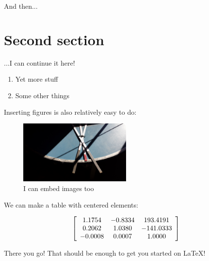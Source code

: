 \documentclass[a4paper,12pt]{article} %
\begin{document}
\noindent
And then...

\section{Second section}

...I can continue it here!

\vspace{5mm}
\begin{enumerate}[resume]
\item Yet more stuff
\item Some other things
\end{enumerate}
\vspace{5mm}

Inserting figures is also relatively easy to do: 

\vspace{5mm}
\begin{figure}[!ht]
  \centering
  \includegraphics[width=0.5\textwidth]{test_image.jpg}
  \caption{I can embed images too}
\end{figure}

\noindent
We can make a table with centered elements:

\vspace{5mm}
\[ \left[ \begin{array}{c c c}
1.1754 & -0.8334 & 193.4191\\
0.2062 & 1.0380 & -141.0333\\
-0.0008 & 0.0007 & 1.0000\\
\end{array}
\right] \]
\vspace{5mm}

\noindent
There you go! That should be enough to get you started on LaTeX!
\end{document}
